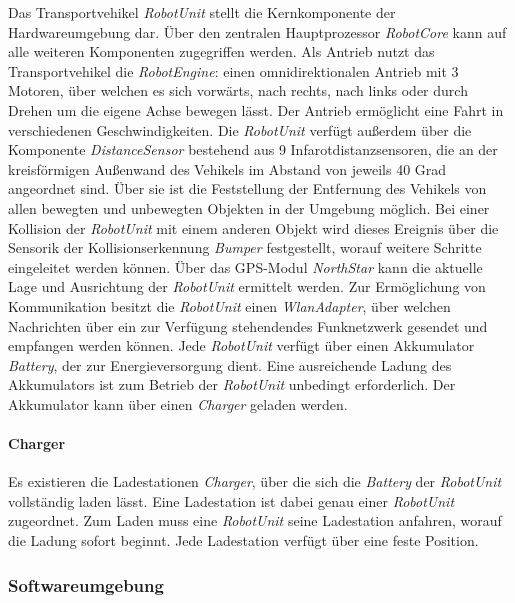   Das Transportvehikel \emph{RobotUnit} stellt die Kernkomponente der Hardwareumgebung dar.
  Über den zentralen Hauptprozessor \emph{RobotCore} kann auf alle weiteren Komponenten zugegriffen werden.
  Als Antrieb nutzt das Transportvehikel die \emph{RobotEngine}: einen omnidirektionalen Antrieb mit 3 Motoren, über welchen es sich vorwärts, nach rechts, nach links oder durch Drehen um die eigene Achse bewegen lässt.
  Der Antrieb ermöglicht eine Fahrt in verschiedenen Geschwindigkeiten.
  Die \emph{RobotUnit} verfügt außerdem über die Komponente \emph{DistanceSensor} bestehend aus 9 Infarotdistanzsensoren, die an der kreisförmigen Außenwand des Vehikels im Abstand von jeweils 40 Grad angeordnet sind.
  Über sie ist die Feststellung der Entfernung des Vehikels von allen bewegten und unbewegten Objekten in der Umgebung möglich.
  Bei einer Kollision der \emph{RobotUnit} mit einem anderen Objekt wird dieses Ereignis über die Sensorik der Kollisionserkennung \emph{Bumper} festgestellt, worauf weitere Schritte eingeleitet werden können.
  Über das GPS-Modul \emph{NorthStar} kann die aktuelle Lage und Ausrichtung der \emph{RobotUnit} ermittelt werden.
  Zur Ermöglichung von Kommunikation besitzt die \emph{RobotUnit} einen \emph{WlanAdapter}, über welchen Nachrichten über ein zur Verfügung stehendendes Funknetzwerk gesendet und empfangen werden können.
  Jede \emph{RobotUnit} verfügt über einen Akkumulator \emph{Battery}, der zur Energieversorgung dient.
  Eine ausreichende Ladung des Akkumulators ist zum Betrieb der \emph{RobotUnit} unbedingt erforderlich.
  Der Akkumulator kann über einen \emph{Charger} geladen werden.

  \paragraph{Charger}\label{charger}

  Es existieren die Ladestationen \emph{Charger}, über die sich die \emph{Battery} der \emph{RobotUnit} vollständig laden lässt.
  Eine Ladestation ist dabei genau einer \emph{RobotUnit} zugeordnet.
  Zum Laden muss eine \emph{RobotUnit} seine Ladestation anfahren, worauf die Ladung sofort beginnt.
  Jede Ladestation verfügt über eine feste Position.

    \subsubsection{Softwareumgebung}

